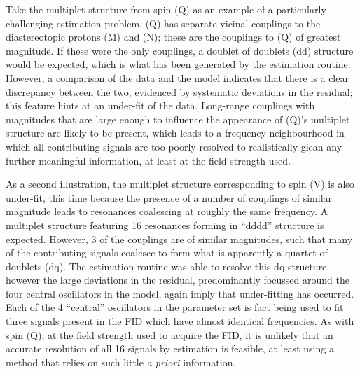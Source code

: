 Take the multiplet structure from spin (Q) as an example of a particularly
challenging estimation problem.
(Q) has separate vicinal couplings to the
diastereotopic protons (M) and (N); these are the couplings to
(Q) of greatest magnitude. If these were the only couplings, a doublet of doublets
(dd) structure would be expected, which is what has been generated by
the estimation routine.
However, a comparison of the data and
the model indicates that there is a clear discrepancy between the two,
evidenced by systematic deviations in the residual; this feature hints at an
under-fit of the data.
Long-range couplings with magnitudes that are large enough to influence the
appearance of (Q)'s multiplet structure are likely to be present, which leads
to a frequency neighbourhood in which all contributing signals are too poorly
resolved to realistically glean any further meaningful information, at least at
the field strength used.

As a second illustration, the multiplet structure corresponding to spin (V) is also
under-fit, this time because the presence of a number of couplings of similar
magnitude leads to resonances coalescing at roughly the same frequency. A
multiplet structure featuring 16 resonances forming in ``dddd'' structure is
expected. However, 3 of the couplings are of similar magnitudes, such that
many of the contributing signals coalesce to form what is apparently a quartet
of doublets (dq).
The estimation routine was able to resolve this dq structure,
however the large deviations in the residual, predominantly focussed around the
four central oscillators in the model, again imply that under-fitting has
occurred. Each of the 4 ``central'' oscillators in the parameter set is
fact being used to fit three signals present in the \ac{FID} which have almost
identical frequencies. As with spin (Q), at the field strength used to acquire the
\ac{FID}, it is unlikely that an accurate resolution of all 16 signals by
estimation is feasible, at least using a method that relies on such little
\emph{a priori} information.

